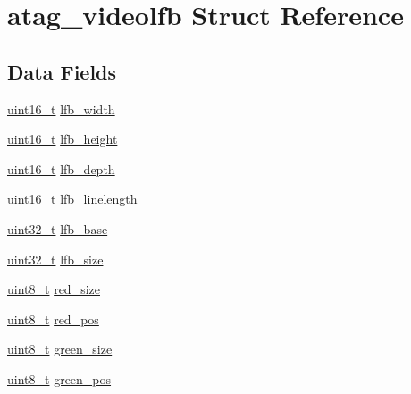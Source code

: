 \hypertarget{structatag__videolfb}{\section{atag\-\_\-videolfb \-Struct \-Reference}
\label{structatag__videolfb}
}
\subsection*{\-Data \-Fields}
\begin{DoxyCompactItemize}
\item 
\hyperlink{arch__types_8h_a273cf69d639a59973b6019625df33e30}{uint16\-\_\-t} \hyperlink{structatag__videolfb_ad9683bde4f1b9753114579a20f8b2ea6}{lfb\-\_\-width}
\item 
\hyperlink{arch__types_8h_a273cf69d639a59973b6019625df33e30}{uint16\-\_\-t} \hyperlink{structatag__videolfb_a6f3799e51d4a717803188027c594bb78}{lfb\-\_\-height}
\item 
\hyperlink{arch__types_8h_a273cf69d639a59973b6019625df33e30}{uint16\-\_\-t} \hyperlink{structatag__videolfb_a1e9d69114f74762a7cf07784f2bf54e1}{lfb\-\_\-depth}
\item 
\hyperlink{arch__types_8h_a273cf69d639a59973b6019625df33e30}{uint16\-\_\-t} \hyperlink{structatag__videolfb_a190b2b21aaf18f335c623ec415bf3bf2}{lfb\-\_\-linelength}
\item 
\hyperlink{arch__types_8h_a435d1572bf3f880d55459d9805097f62}{uint32\-\_\-t} \hyperlink{structatag__videolfb_a9271f1ecad08469fd6f7c70fcf639b28}{lfb\-\_\-base}
\item 
\hyperlink{arch__types_8h_a435d1572bf3f880d55459d9805097f62}{uint32\-\_\-t} \hyperlink{structatag__videolfb_afa0a0332b26a2414c29750b989c2bd99}{lfb\-\_\-size}
\item 
\hyperlink{arch__types_8h_aba7bc1797add20fe3efdf37ced1182c5}{uint8\-\_\-t} \hyperlink{structatag__videolfb_a466eb668b84c08bf28de034321c29241}{red\-\_\-size}
\item 
\hyperlink{arch__types_8h_aba7bc1797add20fe3efdf37ced1182c5}{uint8\-\_\-t} \hyperlink{structatag__videolfb_a7e871d12fa956ff686bf9d2d39788d70}{red\-\_\-pos}
\item 
\hyperlink{arch__types_8h_aba7bc1797add20fe3efdf37ced1182c5}{uint8\-\_\-t} \hyperlink{structatag__videolfb_a282829825c751f574c461ea4e2a21b81}{green\-\_\-size}
\item 
\hyperlink{arch__types_8h_aba7bc1797add20fe3efdf37ced1182c5}{uint8\-\_\-t} \hyperlink{structatag__videolfb_a298fca41fa1fd8bc98c232788ab7d47f}{green\-\_\-pos}

\end{DoxyCompactItemize}

